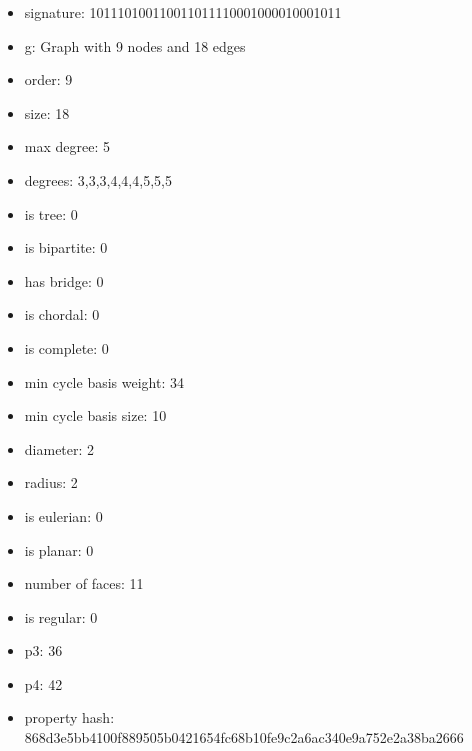 \newpage
\begin{figure}
\end{figure}
\begin{itemize}
\item signature: 101110100110011011110001000010001011
\item g: Graph with 9 nodes and 18 edges
\item order: 9
\item size: 18
\item max degree: 5
\item degrees: 3,3,3,4,4,4,5,5,5
\item is tree: 0
\item is bipartite: 0
\item has bridge: 0
\item is chordal: 0
\item is complete: 0
\item min cycle basis weight: 34
\item min cycle basis size: 10
\item diameter: 2
\item radius: 2
\item is eulerian: 0
\item is planar: 0
\item number of faces: 11
\item is regular: 0
\item p3: 36
\item p4: 42
\item property hash: 868d3e5bb4100f889505b0421654fc68b10fe9c2a6ac340e9a752e2a38ba2666
\end{itemize}
